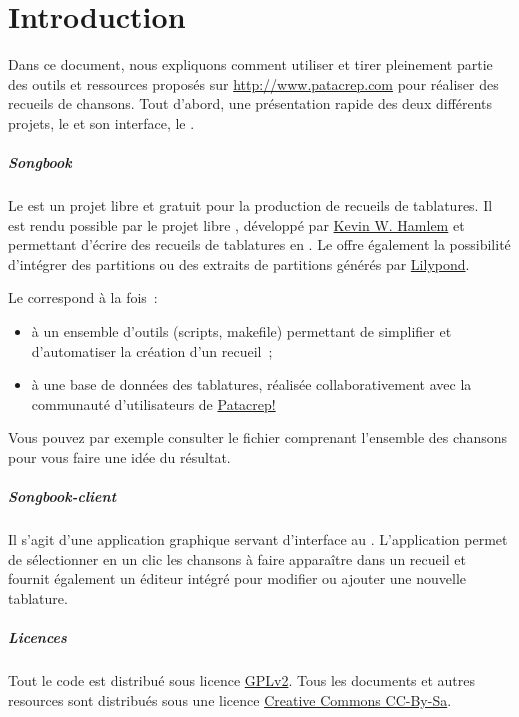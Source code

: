 \chapter*{Introduction}
\minitoc
\label{chap:introduction}

Dans ce document, nous expliquons comment utiliser et tirer pleinement
partie des outils et ressources proposés sur
\url{http://www.patacrep.com} pour réaliser des recueils de
chansons. Tout d'abord, une présentation rapide des deux différents
projets, le \songbook et son interface, le \client.

\paragraph{Songbook}
Le \songbook est un projet libre et gratuit pour la production de
recueils de tablatures. Il est rendu possible par le projet libre
\songs, développé par \href{http://www.utdallas.edu/~hamlen}{Kevin
  W. Hamlem} et permettant d'écrire des recueils de tablatures en
\latex. Le \songbook offre également la possibilité d'intégrer des
partitions ou des extraits de partitions générés par
\href{http://lilypond.org}{Lilypond}.

Le \songbook correspond à la fois~:
\begin{itemize}
\item à un ensemble d'outils (scripts, makefile) permettant de
  simplifier et d'automatiser la création d'un recueil~;
\item à une base de données des tablatures, réalisée collaborativement
  avec la communauté d'utilisateurs de
  \href{http://www.patacrep.com}{Patacrep!}
\end{itemize}

Vous pouvez par exemple consulter le fichier
\href{http://www.patacrep.com/data/documents/songbook.pdf}{}
comprenant l'ensemble des chansons pour vous faire une idée du
résultat.

\paragraph{Songbook-client}
Il s'agit d'une application graphique servant d'interface au
\songbook. L'application permet de sélectionner en un clic les chansons
à faire apparaître dans un recueil et fournit également un éditeur
intégré pour modifier ou ajouter une nouvelle tablature.

\paragraph{Licences}
Tout le code est distribué sous licence
\href{http://www.gnu.org/licenses/gpl.html}{GPLv2}. Tous les documents
et autres resources sont distribués sous une licence
\href{http://creativecommons.org/}{Creative Commons CC-By-Sa}.
